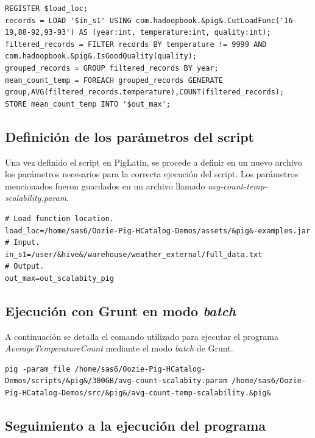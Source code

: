 \begin{lstlisting}[linewidth=\columnwidth,breaklines=true]
REGISTER $load_loc; 
records = LOAD '$in_s1' USING com.hadoopbook.&pig&.CutLoadFunc('16-19,88-92,93-93') AS (year:int, temperature:int, quality:int);
filtered_records = FILTER records BY temperature != 9999 AND com.hadoopbook.&pig&.IsGoodQuality(quality); 
grouped_records = GROUP filtered_records BY year; 
mean_count_temp = FOREACH grouped_records GENERATE group,AVG(filtered_records.temperature),COUNT(filtered_records); 
STORE mean_count_temp INTO '$out_max'; 
\end{lstlisting} 


\subsection{Definición de los parámetros del script}

Una vez definido el script en PigLatin, se procede a definir en un nuevo archivo los parámetros necesarios para la correcta ejecución del script. Los parámetros mencionados fueron guardados en un archivo llamado \textit{avg-count-temp-scalability.param}.

\begin{lstlisting}[linewidth=\columnwidth,breaklines=true]
# Load function location.
load_loc=/home/sas6/Oozie-Pig-HCatalog-Demos/assets/&pig&-examples.jar
# Input.
in_s1=/user/&hive&/warehouse/weather_external/full_data.txt
# Output.
out_max=out_scalabity_pig
\end{lstlisting}

\subsection{Ejecución con Grunt en modo \textit{batch}}

A continuación se detalla el comando utilizado para ejecutar el programa \textit{AverageTemperatureCount} mediante el modo \textit{batch} de Grunt.

\begin{lstlisting}[linewidth=\columnwidth,breaklines=true]
pig -param_file /home/sas6/Oozie-Pig-HCatalog-Demos/scripts/&pig&/300GB/avg-count-scalabity.param /home/sas6/Oozie-Pig-HCatalog-Demos/src/&pig&/avg-count-temp-scalability.&pig&
\end{lstlisting}

\subsection{Seguimiento a la ejecución del programa}

